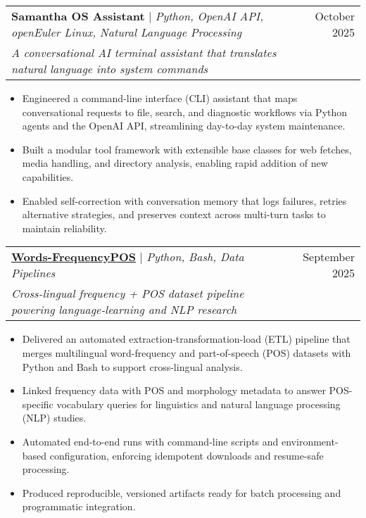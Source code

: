 \documentclass[letterpaper,11pt]{article}
\makeatletter
\newcommand{\resumeItem}[1]{
  \item\small{
    {#1 \vspace{-2pt}}
  }
}
\newcommand{\resumeProjectHeading}[3]{
    \item
    \begin{tabular*}{0.97\textwidth}{l@{\extracolsep{\fill}}r}
      \small#1 & #2 \\
      \textit{\small #3} & \\
    \end{tabular*}\vspace{-7pt}
}
\newcommand{\resumeItemListStart}{\begin{itemize}}
\newcommand{\resumeItemListEnd}{\end{itemize}\vspace{-5pt}}
\makeatother
\begin{document}
\resumeProjectHeading
{\textbf{Samantha OS Assistant} $|$ \emph{Python, OpenAI API, openEuler Linux, Natural Language Processing}}{October 2025}{A conversational AI terminal assistant that translates natural language into system commands}
\resumeItemListStart
\resumeItem{Engineered a command-line interface (CLI) assistant that maps conversational requests to file, search, and diagnostic workflows via Python agents and the OpenAI API, streamlining day-to-day system maintenance.}
\resumeItem{Built a modular tool framework with extensible base classes for web fetches, media handling, and directory analysis, enabling rapid addition of new capabilities.}
\resumeItem{Enabled self-correction with conversation memory that logs failures, retries alternative strategies, and preserves context across multi-turn tasks to maintain reliability.}
\resumeItemListEnd



\resumeProjectHeading
{\textbf{\href{https://github.com/vsharha/Words-FrequencyPOS}{\underline{Words-FrequencyPOS}}} $|$ \emph{Python, Bash, Data Pipelines}}{September 2025}{Cross-lingual frequency + POS dataset pipeline powering language-learning and NLP research}
\resumeItemListStart
\resumeItem{Delivered an automated extraction-transformation-load (ETL) pipeline that merges multilingual word-frequency and part-of-speech (POS) datasets with Python and Bash to support cross-lingual analysis.}
\resumeItem{Linked frequency data with POS and morphology metadata to answer POS-specific vocabulary queries for linguistics and natural language processing (NLP) studies.}
\resumeItem{Automated end-to-end runs with command-line scripts and environment-based configuration, enforcing idempotent downloads and resume-safe processing.}
\resumeItem{Produced reproducible, versioned artifacts ready for batch processing and programmatic integration.}
\resumeItemListEnd
\end{document}
